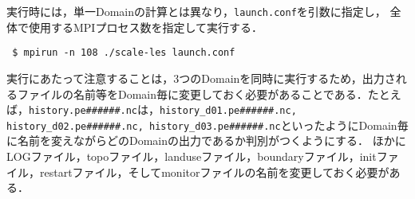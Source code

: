 実行時には，単一Domainの計算とは異なり，\verb|launch.conf|を引数に指定し，
全体で使用するMPIプロセス数を指定して実行する．
\begin{verbatim}
 $ mpirun -n 108 ./scale-les launch.conf
\end{verbatim}

実行にあたって注意することは，3つのDomainを同時に実行するため，出力されるファイルの名前等をDomain毎に変更しておく必要があることである．たとえば，\verb|history.pe######.nc|は，\verb|history_d01.pe######.nc, history_d02.pe######.nc, history_d03.pe######.nc|といったようにDomain毎に名前を変えながらどのDomainの出力であるか判別がつくようにする．
ほかにLOGファイル，topoファイル，landuseファイル，boundaryファイル，initファイル，restartファイル，そしてmonitorファイルの名前を変更しておく必要がある．

